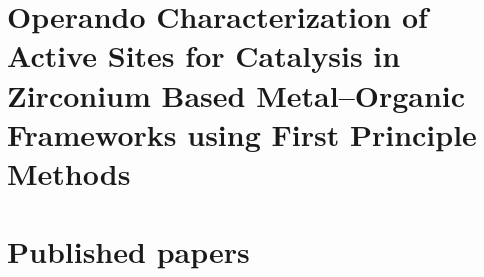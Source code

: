 \documentclass[10pt,twoside]{book}
\newcommand\oddpageleftmark{}
\newcommand\evenpagerightmark{}
\begin{document}
\renewcommand*{\thesection}{\thechapter.\arabic{section}}       %

\graphicspath{{figures/}}


\mainmatter     %
\renewcommand*{\thesection}{\thechapter.\arabic{section}}

\newcommand\fdtsvrightmarktmp{{\scshape\small Chapter }}
\renewcommand\evenpagerightmark{{\scshape\small\chaptername\ \thechapter}}
\renewcommand\oddpageleftmark{{\scshape\small\leftmark}}



\baselineskip 13.0pt

\part{Operando Characterization of Active Sites for Catalysis in Zirconium Based Metal--Organic Frameworks using First Principle Methods}
\graphicspath{{figures/}}





\part{Published papers}
%


\appendix

%
%


% 
\clearpage{\pagestyle{empty}\cleardoublepage}




\cleardoublepage

\end{document}
